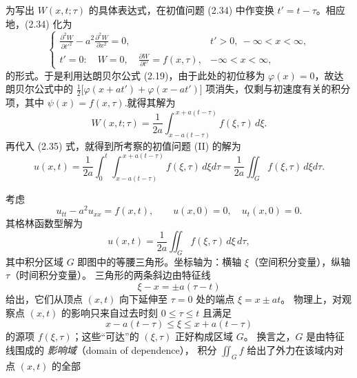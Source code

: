 为写出 $W(x,t;\tau)$ 的具体表达式，在初值问题 (2.34) 中作变换 $t' = t - \tau$。相应地，(2.34) 化为
\[
\begin{cases}
\displaystyle \frac{\partial^2 W}{\partial t'^2} - a^2 \frac{\partial^2 W}{\partial x^2} = 0, & t'>0,\ -\infty<x<\infty, \\[1.0ex]
t'=0: \quad W=0, \quad \frac{\partial W}{\partial t'} = f(x,\tau), & -\infty<x<\infty,
\end{cases}
\tag{2.36}
\]
的形式。于是利用达朗贝尔公式 (2.19)，由于此处的初位移为 $\varphi(x)=0$，故达朗贝尔公式中的
$
\frac{1}{2}\bigl[\varphi(x+a t')+\varphi(x-a t')\bigr]
$
项消失，仅剩与初速度有关的积分项，其中
$
\psi(x)=f(x,\tau).
$就得其解为
\[
W(x,t;\tau) = \frac{1}{2a} \int_{x-a(t-\tau)}^{\,x+a(t-\tau)} f(\xi,\tau)\, d\xi. \tag{2.37}
\]
再代入 (2.35) 式，就得到所考察的初值问题 (II) 的解为
\[
u(x,t) = \frac{1}{2a} \int_0^t \int_{x-a(t-\tau)}^{\,x+a(t-\tau)} f(\xi,\tau)\, d\xi d\tau
= \frac{1}{2a} \iint_G f(\xi,\tau)\, d\xi d\tau. \tag{2.38}
\]
\begin{center}
\end{center}
\begin{proposition}
考虑
\[
u_{tt}-a^2u_{xx}=f(x,t), \qquad u(x,0)=0,\quad u_t(x,0)=0.
\]
其格林函数型解为
\[
u(x,t)=\frac{1}{2a}\iint_{G} f(\xi,\tau)\,d\xi\,d\tau,
\]
其中积分区域 $G$ 即图中的等腰三角形。坐标轴为：横轴 $\xi$（空间积分变量），纵轴 $\tau$（时间积分变量）。
三角形的两条斜边由特征线
\[
\xi - x = \pm a(\tau - t)
\]
给出，它们从顶点 $(x,t)$ 向下延伸至 $\tau=0$ 处的端点 $\xi = x \pm a t$。
物理上，对观察点 $(x,t)$ 的影响只来自过去时刻 $0\le \tau \le t$ 且满足
\[
x-a(t-\tau)\le \xi \le x+a(t-\tau)
\]
的源项 $f(\xi,\tau)$；这些“可达”的 $(\xi,\tau)$ 正好构成区域 $G$。
换言之，$G$ 是由特征线围成的 \emph{影响域}（domain of dependence），
积分 $\iint_G f$ 给出了外力在该域内对点 $(x,t)$ 的全部
\end{proposition}
